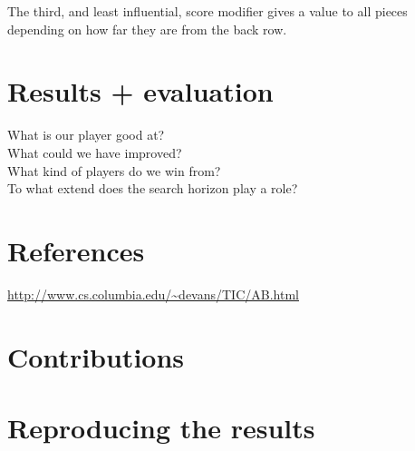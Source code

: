 \documentclass[11pt,a4paper]{article}
\begin{document}
The third, and least influential, score modifier gives a value to all pieces depending on how far they are from the back row.

\section{Results + evaluation}
What is our player good at?\\
What could we have improved?\\
What kind of players do we win from?\\
To what extend does the search horizon play a role? %

\section{References}
\url{http://www.cs.columbia.edu/~devans/TIC/AB.html}
\section{Contributions}
\section{Reproducing the results}
\end{document}
